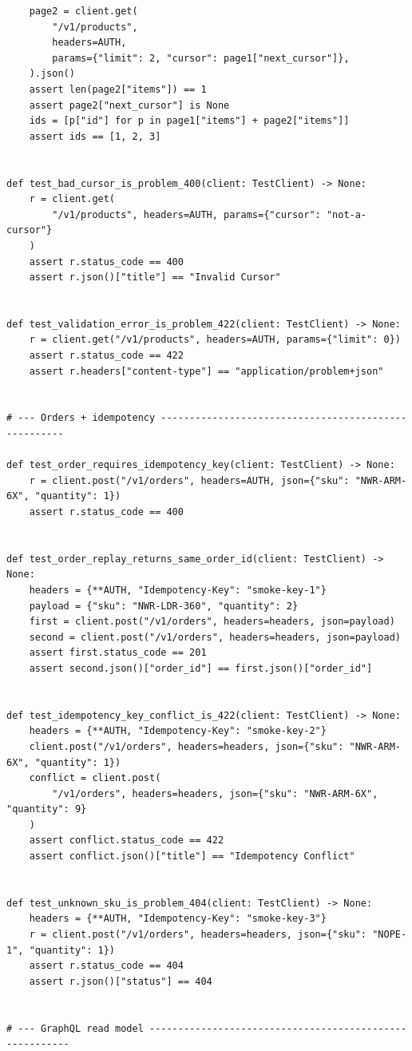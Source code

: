 \begin{verbatim}
    page2 = client.get(
        "/v1/products",
        headers=AUTH,
        params={"limit": 2, "cursor": page1["next_cursor"]},
    ).json()
    assert len(page2["items"]) == 1
    assert page2["next_cursor"] is None
    ids = [p["id"] for p in page1["items"] + page2["items"]]
    assert ids == [1, 2, 3]


def test_bad_cursor_is_problem_400(client: TestClient) -> None:
    r = client.get(
        "/v1/products", headers=AUTH, params={"cursor": "not-a-cursor"}
    )
    assert r.status_code == 400
    assert r.json()["title"] == "Invalid Cursor"


def test_validation_error_is_problem_422(client: TestClient) -> None:
    r = client.get("/v1/products", headers=AUTH, params={"limit": 0})
    assert r.status_code == 422
    assert r.headers["content-type"] == "application/problem+json"


# --- Orders + idempotency -----------------------------------------------------

def test_order_requires_idempotency_key(client: TestClient) -> None:
    r = client.post("/v1/orders", headers=AUTH, json={"sku": "NWR-ARM-6X", "quantity": 1})
    assert r.status_code == 400


def test_order_replay_returns_same_order_id(client: TestClient) -> None:
    headers = {**AUTH, "Idempotency-Key": "smoke-key-1"}
    payload = {"sku": "NWR-LDR-360", "quantity": 2}
    first = client.post("/v1/orders", headers=headers, json=payload)
    second = client.post("/v1/orders", headers=headers, json=payload)
    assert first.status_code == 201
    assert second.json()["order_id"] == first.json()["order_id"]


def test_idempotency_key_conflict_is_422(client: TestClient) -> None:
    headers = {**AUTH, "Idempotency-Key": "smoke-key-2"}
    client.post("/v1/orders", headers=headers, json={"sku": "NWR-ARM-6X", "quantity": 1})
    conflict = client.post(
        "/v1/orders", headers=headers, json={"sku": "NWR-ARM-6X", "quantity": 9}
    )
    assert conflict.status_code == 422
    assert conflict.json()["title"] == "Idempotency Conflict"


def test_unknown_sku_is_problem_404(client: TestClient) -> None:
    headers = {**AUTH, "Idempotency-Key": "smoke-key-3"}
    r = client.post("/v1/orders", headers=headers, json={"sku": "NOPE-1", "quantity": 1})
    assert r.status_code == 404
    assert r.json()["status"] == 404


# --- GraphQL read model --------------------------------------------------------


\end{verbatim}
